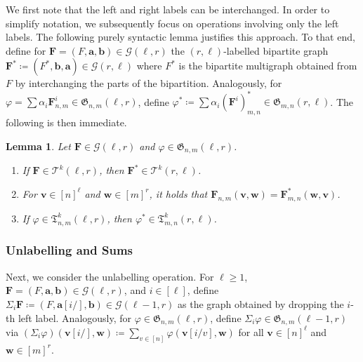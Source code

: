 \documentclass[11pt, DIV=15]{scrarticle}
\theoremstyle{definition}
\theoremstyle{plain}
\newtheorem{lemma}[definition]{Lemma}
\theoremstyle{remark}
\renewcommand{\phi}{\varphi}
\begin{document}
	We first note that the left and right labels can be interchanged.
	In order to simplify notation, we subsequently focus on operations involving only the left labels.
	The following purely syntactic lemma justifies this approach.
	To that end,
	define for $\boldsymbol{F} = (F, \boldsymbol{a}, \boldsymbol{b}) \in \mathcal{G}(\ell, r)$
	the $(r,\ell)$-labelled bipartite graph
	 $\boldsymbol{F}^* \coloneqq (F^*, \boldsymbol{b}, \boldsymbol{a})  \in \mathcal{G}(r, \ell)$ where $F^*$ is the bipartite multigraph obtained from $F$ by interchanging the parts of the bipartition.
	Analogously, for $\phi = \sum \alpha_i \boldsymbol{F}^i_{n,m} \in \mathfrak{G}_{n,m}(\ell, r)$,
	define $\phi^* \coloneqq  \sum \alpha_i (\boldsymbol{F}^i)^*_{m,n} \in \mathfrak{G}_{m,n}(r, \ell)$.
        The following
        is then immediate.
	\begin{lemma}\label{lem:reverse}
		Let $\boldsymbol{F} \in \mathcal{G}(\ell, r)$
		and $\phi \in \mathfrak{G}_{n,m}(\ell, r)$.
		\begin{enumerate}
			\item If $\boldsymbol{F} \in \mathcal{T}^k(\ell, r)$,
			then $\boldsymbol{F}^* \in \mathcal{T}^k(r, \ell)$.
			\item For $\boldsymbol{v} \in [n]^\ell$ and
                          $\boldsymbol{w} \in [m]^r$, it holds that $\boldsymbol{F}_{n,m}(\boldsymbol{v}, \boldsymbol{w}) = \boldsymbol{F}^*_{m,n}(\boldsymbol{w}, \boldsymbol{v})$.
			\item If $\phi \in \mathfrak{T}^k_{n,m}(\ell, r)$, then $\phi^* \in \mathfrak{T}^k_{m,n}(r, \ell)$.
		\end{enumerate}
		
	\end{lemma}
	
	\subsubsection{Unlabelling and Sums}
	Next, we consider the unlabelling operation.
	For $\ell \geq 1$, $\boldsymbol{F} = (F, \boldsymbol{a}, \boldsymbol{b}) \in \mathcal{G}(\ell, r)$, and $i \in [\ell]$,
	define $\Sigma_i \boldsymbol{F} \coloneqq (F, \boldsymbol{a}[i/], \boldsymbol{b}) \in \mathcal{G}(\ell-1, r)$
	as the graph obtained by dropping the $i$-th left label.
	Analogously, 
	for $\phi \in \mathfrak{G}_{n,m}(\ell, r)$,
	define $\Sigma_i\phi \in \mathfrak{G}_{n,m}(\ell-1, r)$ via $(\Sigma_i \phi)(\boldsymbol{v}[i/], \boldsymbol{w}) \coloneqq \sum_{v \in [n]}\phi(\boldsymbol{v}[i/v], \boldsymbol{w})$ for all $\boldsymbol{v} \in [n]^\ell$ and $\boldsymbol{w} \in [m]^r$. 
\end{document}
